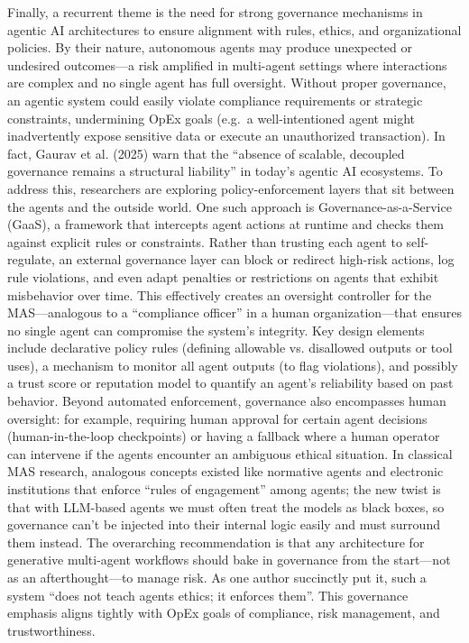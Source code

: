Finally, a recurrent theme is the need for strong governance mechanisms in agentic AI architectures to ensure alignment with rules, ethics, and organizational policies. By their nature, autonomous agents may produce unexpected or undesired outcomes—a risk amplified in multi-agent settings where interactions are complex and no single agent has full oversight. Without proper governance, an agentic system could easily violate compliance requirements or strategic constraints, undermining OpEx goals (e.g.~a well-intentioned agent might inadvertently expose sensitive data or execute an unauthorized transaction). In fact, Gaurav et al. (2025) warn that the “absence of scalable, decoupled governance remains a structural liability” in today's agentic AI ecosystems. To address this, researchers are exploring policy-enforcement layers that sit between the agents and the outside world. One such approach is Governance-as-a-Service (GaaS), a framework that intercepts agent actions at runtime and checks them against explicit rules or constraints. Rather than trusting each agent to self-regulate, an external governance layer can block or redirect high-risk actions, log rule violations, and even adapt penalties or restrictions on agents that exhibit misbehavior over time. This effectively creates an oversight controller for the MAS—analogous to a “compliance officer” in a human organization—that ensures no single agent can compromise the system's integrity. Key design elements include declarative policy rules (defining allowable vs. disallowed outputs or tool uses), a mechanism to monitor all agent outputs (to flag violations), and possibly a trust score or reputation model to quantify an agent's reliability based on past behavior. Beyond automated enforcement, governance also encompasses human oversight: for example, requiring human approval for certain agent decisions (human-in-the-loop checkpoints) or having a fallback where a human operator can intervene if the agents encounter an ambiguous ethical situation. In classical MAS research, analogous concepts existed like normative agents and electronic institutions that enforce “rules of engagement” among agents; the new twist is that with LLM-based agents we must often treat the models as black boxes, so governance can't be injected into their internal logic easily and must surround them instead. The overarching recommendation is that any architecture for generative multi-agent workflows should bake in governance from the start—not as an afterthought—to manage risk. As one author succinctly put it, such a system “does not teach agents ethics; it enforces them”. This governance emphasis aligns tightly with OpEx goals of compliance, risk management, and trustworthiness.

